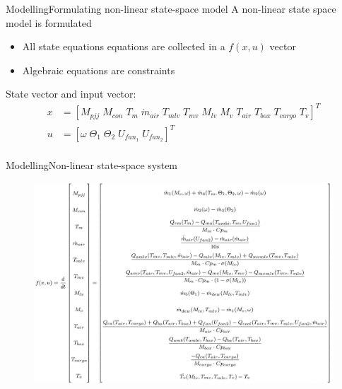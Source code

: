
\begin{frame}{Modelling}{Formulating non-linear state-space model}
	A non-linear state space model is formulated
	\begin{itemize}
		\item All state equations equations are collected in a $f(x,u)$ vector
		\item Algebraic equations are constraints
	\end{itemize}
	State vector and input vector:
	\begin{equation}  \label{eq:xu}
		\begin{split}
			x & = [M_{pjj}	\;
				M_{con} \;
				T_m \;
				\dot{m}_{air}\;
				T_{mlv}      \;
				T_{mv}       \;
				M_{lv}       \;
				M_v          \;
				T_{air}      \;
				T_{box}      \;
				T_{cargo}    \;
				T_v]^T \\
			u & = [\omega	\;
				\Theta_1	\;
				\Theta_2     \;
				U_{fan_1}    \;
				U_{fan_2}]^T \\
		\end{split}
	\end{equation}

\end{frame}




\begin{frame}{Modelling}{Non-linear state-space system}
	\begin{figure}[h!]
		\centering
		\includegraphics[width=1\textwidth]{Graphics/f_x_u.jpeg}
		\label{fig:f_x_u}
	\end{figure}
\end{frame}





